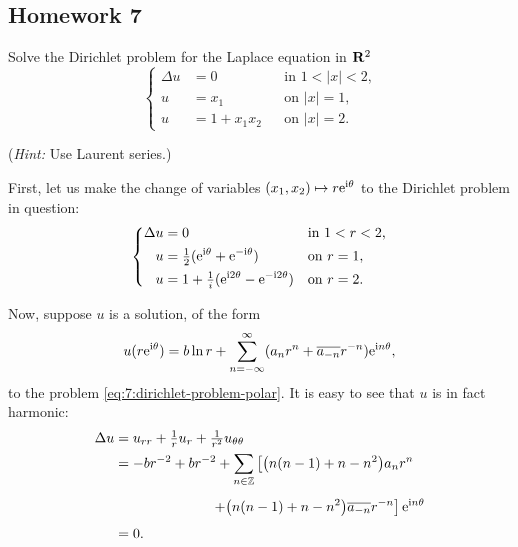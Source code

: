 \subsection{Homework 7}
\begin{problem}
  Solve the Dirichlet problem for the Laplace equation in \(\mathbf{R}^2\)
  \[
    \left\{
      \begin{aligned}
        \Delta u&=0&&\text{in \(1<|x|<2\),}\\
        u&=x_1&&\text{on \(|x|=1\),}\\
        u&=1+x_1x_2&&\text{on \(|x|=2\).}
      \end{aligned}
    \right.
  \]

  \noindent (\emph{Hint:} Use Laurent series.)
\end{problem}
\begin{solution*}
  First, let us make the change of variables \((x_1,x_2)\mapsto
  r\mathrm{e}^{\mathrm{i}\theta}\) to the Dirichlet problem in question:
  \begin{equation}
    \label{eq:7:dirichlet-problem-polar}
    \left\{
      \begin{aligned}
        \Delta u&=0&&\text{in \(1<r<2\),}\\
        u&=\tfrac{1}{2}(\mathrm{e}^{\mathrm{i}\theta}+\mathrm{e}^{-\mathrm{i}\theta})&&\text{on \(r=1\),}\\
        u&=1+\tfrac{1}{i}(\mathrm{e}^{\mathrm{i} 2\theta}-\mathrm{e}^{-\mathrm{i} 2\theta})&&\text{on \(r=2\).}
      \end{aligned}
    \right.
  \end{equation}

  Now, suppose \(u\) is a solution, of the form
  \[
    u(r\rme^{\rmi\theta})=%
    b\ln r%
    +\sum_{n=-\infty}^\infty (a_nr^n+\overline{a_{-n}}r^{-n})\rme^{\rmi n\theta},
  \]
  to the problem \eqref{eq:7:dirichlet-problem-polar}. It is easy to see
  that \(u\) is in fact harmonic:
  \begin{align*}
    \Delta u%
    &=u_{rr}+\tfrac{1}{r}u_r+\tfrac{1}{r^2}u_{\theta\theta}\\
    &=-br^{-2}+br^{-2}+\sum_{n\in\bbZ}
      \left[\bigl(n(n-1)+n-n^2\bigr) a_nr^n\right.\\
    &\phantom{{}={}-\frac{b}{r^2}+\frac{b}{r^2}+}
      \left.+\bigl(n(n-1)+n-n^2\bigr)\overline{a_{-n}}r^{-n}\right]\rme^{\rmi
      n\theta}\\
    &=0.
  \end{align*}


\end{solution*}
